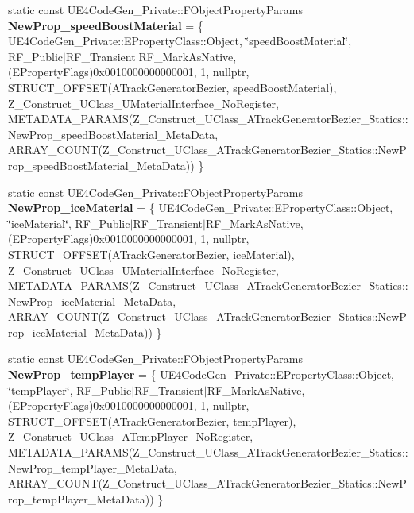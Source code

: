 \begin{DoxyCompactItemize}
static const U\+E4\+Code\+Gen\+\_\+\+Private\+::\+F\+Object\+Property\+Params {\bfseries New\+Prop\+\_\+speed\+Boost\+Material} = \{ U\+E4\+Code\+Gen\+\_\+\+Private\+::\+E\+Property\+Class\+::\+Object, \char`\"{}speed\+Boost\+Material\char`\"{}, R\+F\+\_\+\+Public$\vert$R\+F\+\_\+\+Transient$\vert$R\+F\+\_\+\+Mark\+As\+Native, (E\+Property\+Flags)0x0010000000000001, 1, nullptr, S\+T\+R\+U\+C\+T\+\_\+\+O\+F\+F\+S\+E\+T(\+A\+Track\+Generator\+Bezier, speed\+Boost\+Material), Z\+\_\+\+Construct\+\_\+\+U\+Class\+\_\+\+U\+Material\+Interface\+\_\+\+No\+Register, M\+E\+T\+A\+D\+A\+T\+A\+\_\+\+P\+A\+R\+A\+M\+S(\+Z\+\_\+\+Construct\+\_\+\+U\+Class\+\_\+\+A\+Track\+Generator\+Bezier\+\_\+\+Statics\+::\+New\+Prop\+\_\+speed\+Boost\+Material\+\_\+\+Meta\+Data, A\+R\+R\+A\+Y\+\_\+\+C\+O\+U\+N\+T(\+Z\+\_\+\+Construct\+\_\+\+U\+Class\+\_\+\+A\+Track\+Generator\+Bezier\+\_\+\+Statics\+::\+New\+Prop\+\_\+speed\+Boost\+Material\+\_\+\+Meta\+Data)) \}
\item 
\mbox{\label{struct_z___construct___u_class___a_track_generator_bezier___statics_a553f0a1fe3b4ccf2f5c3ee892d76e2f7}} 
static const U\+E4\+Code\+Gen\+\_\+\+Private\+::\+F\+Object\+Property\+Params {\bfseries New\+Prop\+\_\+ice\+Material} = \{ U\+E4\+Code\+Gen\+\_\+\+Private\+::\+E\+Property\+Class\+::\+Object, \char`\"{}ice\+Material\char`\"{}, R\+F\+\_\+\+Public$\vert$R\+F\+\_\+\+Transient$\vert$R\+F\+\_\+\+Mark\+As\+Native, (E\+Property\+Flags)0x0010000000000001, 1, nullptr, S\+T\+R\+U\+C\+T\+\_\+\+O\+F\+F\+S\+E\+T(\+A\+Track\+Generator\+Bezier, ice\+Material), Z\+\_\+\+Construct\+\_\+\+U\+Class\+\_\+\+U\+Material\+Interface\+\_\+\+No\+Register, M\+E\+T\+A\+D\+A\+T\+A\+\_\+\+P\+A\+R\+A\+M\+S(\+Z\+\_\+\+Construct\+\_\+\+U\+Class\+\_\+\+A\+Track\+Generator\+Bezier\+\_\+\+Statics\+::\+New\+Prop\+\_\+ice\+Material\+\_\+\+Meta\+Data, A\+R\+R\+A\+Y\+\_\+\+C\+O\+U\+N\+T(\+Z\+\_\+\+Construct\+\_\+\+U\+Class\+\_\+\+A\+Track\+Generator\+Bezier\+\_\+\+Statics\+::\+New\+Prop\+\_\+ice\+Material\+\_\+\+Meta\+Data)) \}
\item 
\mbox{\label{struct_z___construct___u_class___a_track_generator_bezier___statics_a750ec133a79c45681e03054cbbda1cde}} 
static const U\+E4\+Code\+Gen\+\_\+\+Private\+::\+F\+Object\+Property\+Params {\bfseries New\+Prop\+\_\+temp\+Player} = \{ U\+E4\+Code\+Gen\+\_\+\+Private\+::\+E\+Property\+Class\+::\+Object, \char`\"{}temp\+Player\char`\"{}, R\+F\+\_\+\+Public$\vert$R\+F\+\_\+\+Transient$\vert$R\+F\+\_\+\+Mark\+As\+Native, (E\+Property\+Flags)0x0010000000000001, 1, nullptr, S\+T\+R\+U\+C\+T\+\_\+\+O\+F\+F\+S\+E\+T(\+A\+Track\+Generator\+Bezier, temp\+Player), Z\+\_\+\+Construct\+\_\+\+U\+Class\+\_\+\+A\+Temp\+Player\+\_\+\+No\+Register, M\+E\+T\+A\+D\+A\+T\+A\+\_\+\+P\+A\+R\+A\+M\+S(\+Z\+\_\+\+Construct\+\_\+\+U\+Class\+\_\+\+A\+Track\+Generator\+Bezier\+\_\+\+Statics\+::\+New\+Prop\+\_\+temp\+Player\+\_\+\+Meta\+Data, A\+R\+R\+A\+Y\+\_\+\+C\+O\+U\+N\+T(\+Z\+\_\+\+Construct\+\_\+\+U\+Class\+\_\+\+A\+Track\+Generator\+Bezier\+\_\+\+Statics\+::\+New\+Prop\+\_\+temp\+Player\+\_\+\+Meta\+Data)) \}

\end{DoxyCompactItemize}
